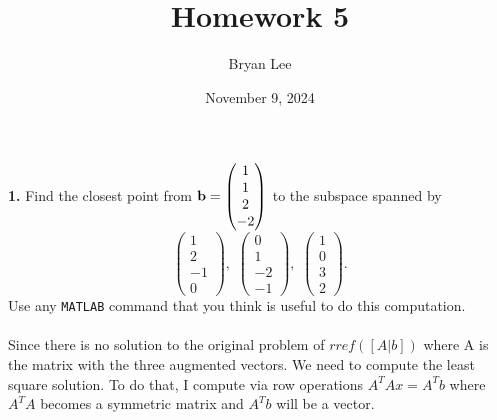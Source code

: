 \documentclass{article}
\title{Homework 5}
\author{Bryan Lee}
\date{November 9, 2024}
\begin{document}
\maketitle

\noindent
{\bf 1.} Find the closest point from ${\bf b} = \begin{pmatrix} 1 \\ 1 \\ 2 \\-2 \end{pmatrix}$ to the subspace spanned by
$$\begin{pmatrix} 1 \\ 2 \\ -1 \\0 \end{pmatrix}, \,\, \begin{pmatrix} 0 \\ 1 \\ -
2 \\ -1 \end{pmatrix}, \,\, \begin{pmatrix} 1 \\ 0 \\ 3 \\ 2 \end{pmatrix}.$$
Use any {\tt MATLAB} command that you think is useful to do this computation. \\

\\
Since there is no solution to the original problem of $rref([A | b])$ where A is the matrix with the three augmented vectors. We need to compute the least square solution. To do that, I compute via row operations $A^T Ax = A^T b$ where $A^T A$ becomes a symmetric matrix and $A^T b$ will be a vector.
\end{document}
